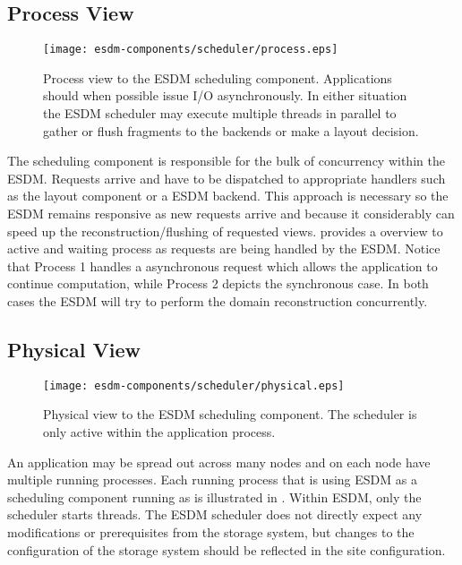 \subsection{Process View}

\begin{figure}
	\centering
	\texttt{[image: esdm-components/scheduler/process.eps]}
	\caption{Process view to the ESDM scheduling component. Applications should when possible issue I/O asynchronously. In either situation the ESDM scheduler may execute multiple threads in parallel to gather or flush fragments to the backends or make a layout decision.}
	\label{fig:esdm scheduler process view}
\end{figure}

The scheduling component is responsible for the bulk of concurrency within the ESDM.
Requests arrive and have to be dispatched to appropriate handlers such as the layout component or a ESDM backend.
This approach is necessary so the ESDM remains responsive as new requests arrive and because it considerably can speed up the reconstruction/flushing of requested views.
 provides a overview to active and waiting process as requests are being handled by the ESDM. Notice that Process 1 handles a asynchronous request which allows the application to continue computation, while Process 2 depicts the synchronous case.
In both cases the ESDM will try to perform the domain reconstruction concurrently.


\subsection{Physical View}

\begin{figure}
	\centering
	\texttt{[image: esdm-components/scheduler/physical.eps]}
	\caption{Physical view to the ESDM scheduling component. The scheduler is only active within the application process.}
	\label{fig:esdm scheduler physical view}
\end{figure}


An application may be spread out across many nodes and on each node have multiple running processes.
Each running process that is using ESDM as a scheduling component running as is illustrated in .
Within ESDM, only the scheduler starts threads.
The ESDM scheduler does not directly expect any modifications or prerequisites from the storage system, but changes to the configuration of the storage system should be reflected in the site configuration.

%
%
%
%
%
